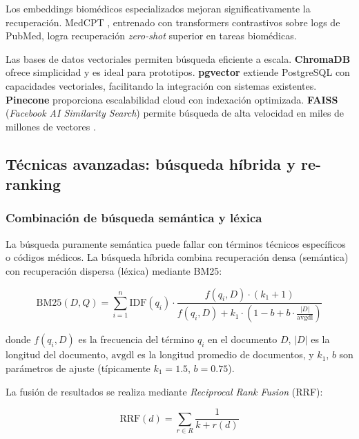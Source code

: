 Los embeddings biomédicos especializados mejoran significativamente la recuperación. MedCPT \parencite{jin2023medcpt}, entrenado con transformers contrastivos sobre logs de PubMed, logra recuperación \textit{zero-shot} superior en tareas biomédicas.

Las bases de datos vectoriales permiten búsqueda eficiente a escala. \textbf{ChromaDB} ofrece simplicidad y es ideal para prototipos. \textbf{pgvector} extiende PostgreSQL con capacidades vectoriales, facilitando la integración con sistemas existentes. \textbf{Pinecone} proporciona escalabilidad cloud con indexación optimizada. \textbf{FAISS} (\textit{Facebook AI Similarity Search}) permite búsqueda de alta velocidad en miles de millones de vectores \parencite{johnson2019faiss}.

\subsection{Técnicas avanzadas: búsqueda híbrida y re-ranking}
\label{subsec:tecnicas_avanzadas}

\subsubsection{Combinación de búsqueda semántica y léxica}

La búsqueda puramente semántica puede fallar con términos técnicos específicos o códigos médicos. La búsqueda híbrida combina recuperación densa (semántica) con recuperación dispersa (léxica) mediante \ac{BM25}:

\begin{equation}
\text{BM25}(D, Q) = \sum_{i=1}^{n} \text{IDF}(q_i) \cdot \frac{f(q_i, D) \cdot (k_1 + 1)}{f(q_i, D) + k_1 \cdot \left(1 - b + b \cdot \frac{|D|}{\text{avgdl}}\right)}
\label{eq:bm25}
\end{equation}

\noindent donde $f(q_i, D)$ es la frecuencia del término $q_i$ en el documento $D$, $|D|$ es la longitud del documento, $\text{avgdl}$ es la longitud promedio de documentos, y $k_1$, $b$ son parámetros de ajuste (típicamente $k_1 = 1.5$, $b = 0.75$).

La fusión de resultados se realiza mediante \textit{Reciprocal Rank Fusion} (\acs{RRF}):

\begin{equation}
\text{RRF}(d) = \sum_{r \in R} \frac{1}{k + r(d)}
\label{eq:rrf}
\end{equation}

